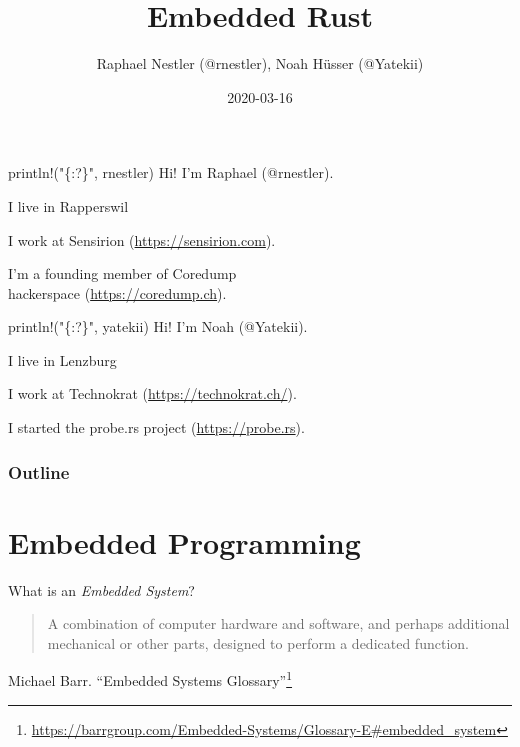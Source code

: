 \documentclass[aspectratio=1610,14pt,t]{beamer}
\title{Embedded Rust}
\date{2020-03-16}
\author{Raphael Nestler (@rnestler), Noah Hüsser (@Yatekii)}
\institute{Rust Zürichsee Meetup}
\begin{document}
\pagecolor{almostwhite}  %
\maketitle


\begin{frame}[c]{println!("\{:?\}", rnestler)}
  Hi! I'm Raphael (@rnestler).

  \pause I live in Rapperswil

  \pause I work at Sensirion ({\small \url{https://sensirion.com}}).

  \pause I'm a founding member of Coredump\\hackerspace ({\small \url{https://coredump.ch}}).
\end{frame}

\begin{frame}[c]{println!("\{:?\}", yatekii)}
  Hi! I'm Noah (@Yatekii).

  \pause I live in Lenzburg

  \pause I work at Technokrat ({\small \url{https://technokrat.ch/}}).

  \pause I started the probe.rs project ({\small \url{https://probe.rs}}).
\end{frame}


\begin{frame}
  \frametitle{Outline}
  \setcounter{tocdepth}{1}
  \tableofcontents
\end{frame}



\section{Embedded Programming}

\begin{frame}[c]{What is an \emph{Embedded System}?}
  \begin{quote}
    A combination of computer hardware and software, and perhaps
    additional mechanical or other parts, designed to perform a dedicated
    function.
  \end{quote}
  Michael Barr. ``Embedded Systems Glossary''\footnote{\tiny\url{https://barrgroup.com/Embedded-Systems/Glossary-E\#embedded\_system}}
\end{frame}
\end{document}
